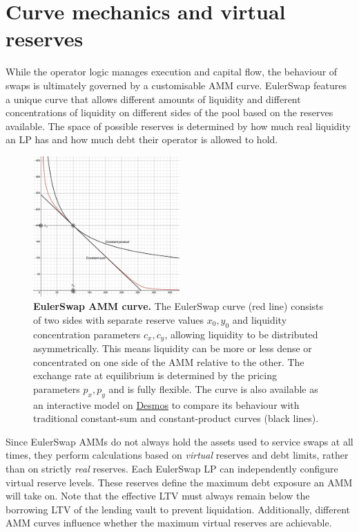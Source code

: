 \documentclass{article}
\begin{document}
\section{Curve mechanics and virtual reserves}

While the operator logic manages execution and capital flow, the behaviour of swaps is ultimately governed by a customisable AMM curve. EulerSwap features a unique curve that allows different amounts of liquidity and different concentrations of liquidity on different sides of the pool based on the reserves available. The space of possible reserves is determined by how much real liquidity an LP has and how much debt their operator is allowed to hold. 

\begin{figure}[h]
\centering
\includegraphics[width=0.5\textwidth]{curve.png}
\caption{\textbf{EulerSwap AMM curve.} The EulerSwap curve (red line) consists of two sides with separate reserve values $x_0, y_0$ and liquidity concentration parameters $c_x, c_y$, allowing liquidity to be distributed asymmetrically. This means liquidity can be more or less dense or concentrated on one side of the AMM relative to the other. The exchange rate at equilibrium is determined by the pricing parameters $p_x, p_y$ and is fully flexible. The curve is also available as an interactive model on \href{https://www.desmos.com/calculator/iczoxr4mhw}{Desmos} to compare its behaviour with traditional constant-sum and constant-product curves (black lines).}
\label{fig:fig1}
\end{figure}

Since EulerSwap AMMs do not always hold the assets used to service swaps at all times, they perform calculations based on \emph{virtual} reserves and debt limits, rather than on strictly \emph{real} reserves. Each EulerSwap LP can independently configure virtual reserve levels. These reserves define the maximum debt exposure an AMM will take on. Note that the effective LTV must always remain below the borrowing LTV of the lending vault to prevent liquidation. Additionally, different AMM curves influence whether the maximum virtual reserves are achievable.
\end{document}
